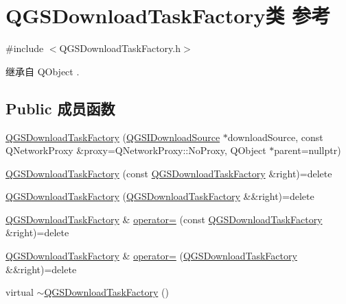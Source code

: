 \hypertarget{class_q_g_s_download_task_factory}{}\section{Q\+G\+S\+Download\+Task\+Factory类 参考}
\label{class_q_g_s_download_task_factory}


{\ttfamily \#include $<$Q\+G\+S\+Download\+Task\+Factory.\+h$>$}



继承自 Q\+Object .

\subsection*{Public 成员函数}
\begin{DoxyCompactItemize}
\item 
\mbox{\hyperlink{class_q_g_s_download_task_factory_a3f0ae57df533bb6ecff62c21483d4a7a}{Q\+G\+S\+Download\+Task\+Factory}} (\mbox{\hyperlink{class_q_g_s_i_download_source}{Q\+G\+S\+I\+Download\+Source}} $\ast$download\+Source, const Q\+Network\+Proxy \&proxy=Q\+Network\+Proxy\+::\+No\+Proxy, Q\+Object $\ast$parent=nullptr)
\item 
\mbox{\hyperlink{class_q_g_s_download_task_factory_a8085b28bd618dff7664a218090a3ff02}{Q\+G\+S\+Download\+Task\+Factory}} (const \mbox{\hyperlink{class_q_g_s_download_task_factory}{Q\+G\+S\+Download\+Task\+Factory}} \&right)=delete
\item 
\mbox{\hyperlink{class_q_g_s_download_task_factory_a49732571087d6e8c7f87cdf2cddb49d4}{Q\+G\+S\+Download\+Task\+Factory}} (\mbox{\hyperlink{class_q_g_s_download_task_factory}{Q\+G\+S\+Download\+Task\+Factory}} \&\&right)=delete
\item 
\mbox{\hyperlink{class_q_g_s_download_task_factory}{Q\+G\+S\+Download\+Task\+Factory}} \& \mbox{\hyperlink{class_q_g_s_download_task_factory_aed201012c4a05735f2244f8688ca1926}{operator=}} (const \mbox{\hyperlink{class_q_g_s_download_task_factory}{Q\+G\+S\+Download\+Task\+Factory}} \&right)=delete
\item 
\mbox{\hyperlink{class_q_g_s_download_task_factory}{Q\+G\+S\+Download\+Task\+Factory}} \& \mbox{\hyperlink{class_q_g_s_download_task_factory_ace93f802d83c6f2bf42cd236e66534db}{operator=}} (\mbox{\hyperlink{class_q_g_s_download_task_factory}{Q\+G\+S\+Download\+Task\+Factory}} \&\&right)=delete
\item 
virtual \mbox{\hyperlink{class_q_g_s_download_task_factory_a2e3889d9fdf101f25aa741dfdcce9aa7}{$\sim$\+Q\+G\+S\+Download\+Task\+Factory}} ()

\end{DoxyCompactItemize}
